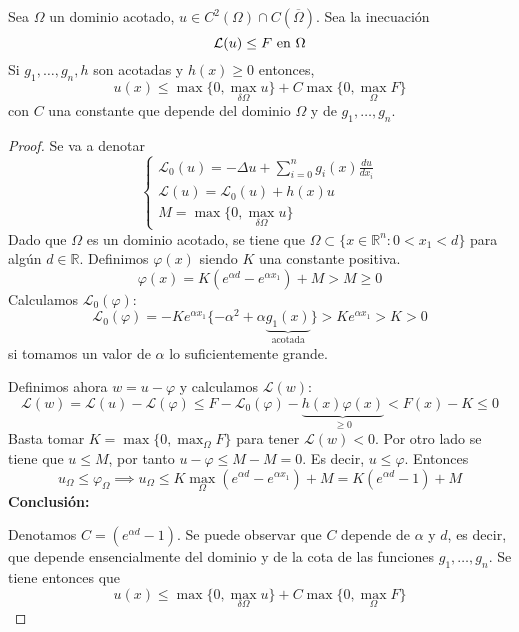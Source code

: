 \newpage
\begin{theorem}
Sea $\Omega$ un dominio acotado, $u\in C^2(\Omega)\cap C(\overline{\Omega})$. 
Sea la inecuación
$$\mathcal{L}(u) \le F  \text{ en } \Omega\\$$
Si $g_1,\hdots,g_n,h$ son acotadas y $h(x) \ge 0$ entonces,
$$u(x) \le \max\{0, \max_{\delta\Omega}u\} + C\max\{0, \max_{\Omega} F\}$$
con $C$ una constante que depende del dominio $\Omega$ y de $g_1,\hdots,g_n$.
\end{theorem}
\begin{proof}
Se va a denotar
\begin{equation*}
\left\{
\begin{array}{l}
\mathcal{L}_0(u)=-\Delta u+\sum_{i=0}^ng_i(x)\frac{du}{dx_i}\\
\mathcal{L}(u) = \mathcal{L}_0(u)+h(x)u\\
M=\max\{0,\max_{\delta\Omega}u\}
\end{array}
\right.
\end{equation*}
Dado que $\Omega$ es un dominio acotado, se tiene que
$\Omega\subset\{x\in\mathbb{R}^n: 0<x_1<d\}$ para algún $d\in\mathbb{R}$.
Definimos $\varphi(x)$ siendo $K$ una constante positiva.
$$\varphi(x)=K\left(e^{\alpha d}-e^{\alpha x_1}\right)+M > M \ge 0$$
Calculamos $\mathcal{L}_0(\varphi)$:
$$\mathcal{L}_0(\varphi)=-Ke^{\alpha x_1}\{-\alpha^2+\alpha \underbrace{g_1(x)}_{\text{acotada}}\}>Ke^{\alpha x_1} > K > 0$$
si tomamos un valor de $\alpha$ lo suficientemente grande.

\noindent Definimos ahora $w=u-\varphi$ y calculamos $\mathcal{L}(w)$:
$$\mathcal{L}(w) = \mathcal{L}(u)-\mathcal{L}(\varphi) \le F - \mathcal{L}_0(\varphi)-\underbrace{h(x)\varphi(x)}_{\ge0}<F(x)-K \le 0$$
Basta tomar $K=\max\{0, \max_{\Omega}F\}$ para tener $\mathcal{L}(w) < 0$.
Por otro lado se tiene que $u\le M$, por tanto $u-\varphi\le M - M = 0$. Es decir, $u \le \varphi$. Entonces 
$$u_\Omega \le \varphi_\Omega\implies u_\Omega \le K\max_\Omega\left(e^{\alpha d}-e^{\alpha x_1}\right) + M = K\left(e^{\alpha d}-1\right) + M$$
\textbf{Conclusión:}

Denotamos $C = \left(e^{\alpha d}-1\right)$. Se puede observar que $C$ depende de $\alpha$ y $d$, es decir, que depende ensencialmente del dominio y de la cota de las funciones $g_1,\hdots,g_n$.
Se tiene entonces que 
$$u(x) \le \max\{0, \max_{\delta\Omega}u\} + C\max\{0, \max_{\Omega} F\}$$
\end{proof}